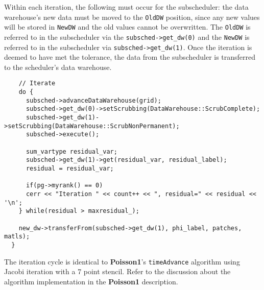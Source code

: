 \documentclass[11pt,fleqn]{book} %
\begin{document}
  Within each iteration, the following must occur for the subscheduler:
  the data warehouse's new data must be moved to the \texttt{OldDW}
  position, since any new values will be stored in \texttt{NewDW} and
  the old values cannot be overwritten.  The \texttt{OldDW} is referred
  to in the subscheduler via the \texttt{subsched->get\_dw(0)} and the
  \texttt{NewDW} is referred to in the subscheduler via
  \texttt{subsched->get\_dw(1)}.  Once the iteration is deemed to have
  met the tolerance, the data from the subscheduler is transferred to
  the scheduler's data warehouse.

  \begin{lstlisting}
    // Iterate
    do {
      subsched->advanceDataWarehouse(grid);
      subsched->get_dw(0)->setScrubbing(DataWarehouse::ScrubComplete);
      subsched->get_dw(1)->setScrubbing(DataWarehouse::ScrubNonPermanent);
      subsched->execute();    

      sum_vartype residual_var;
      subsched->get_dw(1)->get(residual_var, residual_label);
      residual = residual_var;

      if(pg->myrank() == 0)
      cerr << "Iteration " << count++ << ", residual=" << residual << '\n';
    } while(residual > maxresidual_);

    new_dw->transferFrom(subsched->get_dw(1), phi_label, patches, matls);
  }

\end{lstlisting}

The iteration cycle is identical to \textbf{Poisson1}'s
\texttt{timeAdvance} algorithm using Jacobi iteration with a 7 point
stencil.  Refer to the discussion about the algorithm implementation
in the \textbf{Poisson1} description.
\end{document}
